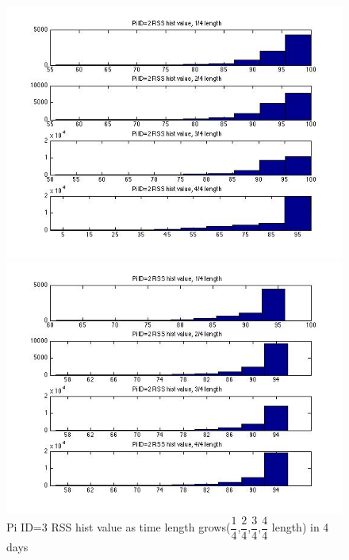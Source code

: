 \documentclass[10pt,conference]{IEEEtran}
\begin{document}
\begin{figure}[htbp]
\begin{minipage}[t]{0.2\textwidth}
	\includegraphics[scale=0.2]{time1-7}
\end{minipage}
\begin{minipage}[t]{0.2\textwidth}
	\centering
	\includegraphics[scale=0.2]{time1-8}
\end{minipage}
\caption{Pi ID=3 RSS hist value as time length grows($\dfrac{1}{4}$,$\dfrac{2}{4}$,$\dfrac{3}{4}$,$\dfrac{4}{4}$ length) in 4 days}\label{hist3}
\end{figure}
\end{document}
